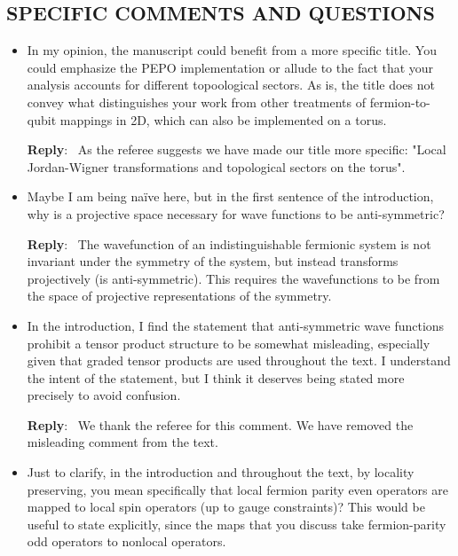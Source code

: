 \documentclass[aps,prx,floatfix,10pt,amssymb,amsfont,amsmath,superscriptaddress,float,nofootinbib,longbibliography,nobalancelastpage]{revtex4-2}
\newenvironment{reply}
   {\medskip \noindent \begin{sf}\textbf{Reply}:\ \color{blue}  }
   {\medskip \end{sf}}
\begin{document}
\subsection*{SPECIFIC COMMENTS AND QUESTIONS}
\begin{itemize}

\item In my opinion, the manuscript could benefit from a more specific title. You could emphasize the PEPO implementation or allude to the fact that your analysis accounts for different topoological sectors. As is, the title does not convey what distinguishes your work from other treatments of fermion-to-qubit mappings in 2D, which can also be implemented on a torus.

\begin{reply}
    As the referee suggests we have made our title more specific: "Local Jordan-Wigner transformations and topological sectors on the torus".
\end{reply}

\item Maybe I am being naïve here, but in the first sentence of the introduction, why is a projective space necessary for wave functions to be anti-symmetric?

\begin{reply}
The wavefunction of an indistinguishable fermionic system is not invariant under the symmetry of the system, but instead transforms projectively (is anti-symmetric). This requires the wavefunctions to be from the space of projective representations of the symmetry.
\end{reply}

\item In the introduction, I find the statement that anti-symmetric wave functions prohibit a tensor product structure to be somewhat misleading, especially given that graded tensor products are used throughout the text. I understand the intent of the statement, but I think it deserves being stated more precisely to avoid confusion.

\begin{reply}
    We thank the referee for this comment. We have removed the misleading comment from the text.
\end{reply}

\item Just to clarify, in the introduction and throughout the text, by locality preserving, you mean specifically that local fermion parity even operators are mapped to local spin operators (up to gauge constraints)? This would be useful to state explicitly, since the maps that you discuss take fermion-parity odd operators to nonlocal operators.


\end{itemize}
\end{document}
